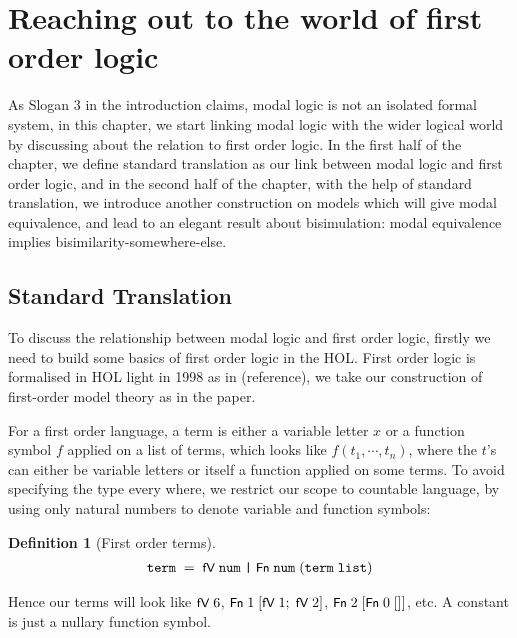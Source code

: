 \documentclass[letterpaper]{article}
\newtheorem{defn}{Definition}
\renewcommand{\HOLConst}[1]{{\textsf{\upshape\small #1}}}
\renewcommand{\HOLinline}[1]{\ensuremath{#1}}
\newenvironment{holmath}{\begin{displaymath}\begin{array}{l}}{\end{array}\end{displaymath}\ignorespacesafterend}
\begin{document}
\section{Reaching out to the world of first order logic}

As Slogan 3 in the introduction claims, modal logic is not an isolated formal system, in this chapter, we start linking modal logic with the wider logical world by discussing about the relation to first order logic. In the first half of the chapter, we define standard translation as our link between modal logic and first order logic, and in the second half of the chapter, with the help of standard translation, we introduce another construction on models which will give modal equivalence, and lead to an elegant result about bisimulation: modal equivalence implies bisimilarity-somewhere-else.

\subsection{Standard Translation}

To discuss the relationship between modal logic and first order logic, firstly we need to build some basics of first order logic in the HOL. First order logic is formalised in HOL light in 1998 as in (reference), we take our construction of first-order model theory as in the paper.

For a first order language, a term is either a variable letter $x$ or a function symbol $f$ applied on a list of terms, which looks like $f(t_1,\cdots,t_n)$, where the $t$'s can either be variable letters or itself a function applied on some terms. To avoid specifying the type every where, we restrict our scope to countable language, by using only natural numbers to denote variable and function symbols:
\begin{defn}[First order terms]
\begin{holmath}
  \HOLTyOp{term}\;=\;\HOLConst{fV}\;\HOLTyOp{num}\;\HOLTokenBar{}\;\HOLConst{Fn}\;\HOLTyOp{num}\;(\HOLTyOp{term}\;\HOLTyOp{list})
\end{holmath}
\end{defn}
Hence our terms will look like \HOLinline{\HOLConst{fV}\;\HOLNumLit{6}}, \HOLinline{\HOLConst{Fn}\;\HOLNumLit{1}\;[\HOLConst{fV}\;\HOLNumLit{1};\;\HOLConst{fV}\;\HOLNumLit{2}]}, \HOLinline{\HOLConst{Fn}\;\HOLNumLit{2}\;[\HOLConst{Fn}\;\HOLNumLit{0}\;[]]}, etc. A constant is just a nullary function symbol.
\end{document}
